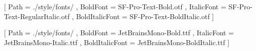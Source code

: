 \usepackage{geometry}
\geometry{
    top=3.0cm,
    bottom=3.0cm,
    outer=3.0cm,
    inner=3.0cm
}

\setlength{\parindent}{0em} %

\usepackage{fontspec}
\setmainfont{SF-Pro-Text-Regular.otf}[
    Path = ./style/fonts/ ,
    BoldFont = SF-Pro-Text-Bold.otf ,
    ItalicFont = SF-Pro-Text-RegularItalic.otf ,
    BoldItalicFont = SF-Pro-Text-BoldItalic.otf ]

\setmonofont{JetBrainsMono-Regular.ttf}[
    Path = ./style/fonts/ ,
    BoldFont = JetBrainsMono-Bold.ttf ,
    ItalicFont = JetBrainsMono-Italic.ttf ,
    BoldItalicFont = JetBrainsMono-BoldItalic.ttf ]

\usepackage[fixed]{fontawesome5} %

\usepackage[dayofweek]{datetime}
\shortdate

\usepackage{hyperref, url}

\usepackage[labelfont={bf,sc},labelsep=period]{caption}